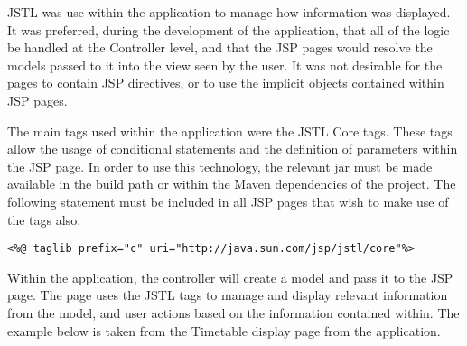 JSTL was use within the application to manage how information was displayed. It was preferred, during the development of the application, that all of the logic be handled at the Controller level, and that the JSP pages would resolve the models passed to it into the view seen by the user. It was not desirable for the pages to contain JSP directives, or to use the implicit objects contained within JSP pages. 

The main tags used within the application were the JSTL Core tags.  These tags allow the usage of conditional statements and the definition of parameters within the JSP page. In order to use this technology, the relevant jar must be made available in the build path or within the Maven dependencies of the project. The following statement must be included in all JSP pages that wish to make use of the tags also.\newline

\begin{lstlisting}
<%@ taglib prefix="c" uri="http://java.sun.com/jsp/jstl/core"%>
\end{lstlisting}

Within the application, the controller will create a model and pass it to the JSP page. The page uses the JSTL tags to manage and display relevant information from the model, and user actions based on the information contained within. The example below is taken from the Timetable display page from the application.\newline

